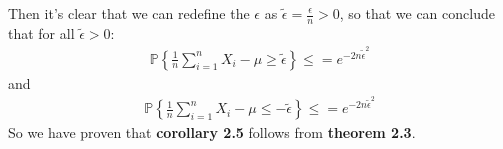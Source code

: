 Then it's clear that we can redefine the $\epsilon$ as $\tilde{\epsilon} = \frac{\epsilon}{n} > 0$, so that we can conclude that for all $\tilde{\epsilon}>0$:
\begin{align}
\mathbb{P}\left\{\frac{1}{n} \sum_{i=1}^n X_i - \mu \geq \tilde{\epsilon} \right\} \leq = e^{- 2n \tilde{\epsilon}^2 }
\end{align}
and
\begin{align}
\mathbb{P}\left\{\frac{1}{n} \sum_{i=1}^n X_i - \mu \leq - \tilde{\epsilon} \right\} \leq = e^{- 2n \tilde{\epsilon}^2 }
\end{align}
So we have proven that \textbf{corollary 2.5} follows from \textbf{theorem 2.3}.
